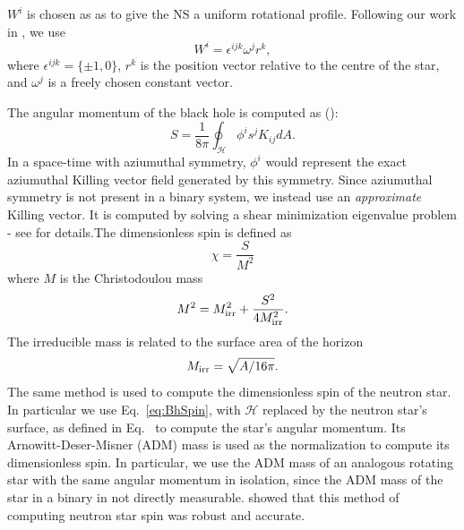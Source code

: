 $W^i$ is chosen as as to give the NS a uniform rotational
profile. Following our work in \cite{Tacik:2015tja}, we use
\begin{equation}
\label{eq:RotationTerm}
W^i=\epsilon^{ijk}\omega^jr^k,
\end{equation}
where $\epsilon^{ijk}=\{\pm1,0\}$, $r^k$ is the position vector relative to the centre of the star, and $\omega^j$ is a freely chosen constant vector.

The angular momentum of the black hole is computed as  (\cite{FoucartEtAl:2008}):
\begin{equation}
\label{eq:BhSpin}
S=\frac{1}{8\pi}\oint_{\mathcal{H}}\phi^is^jK_{ij}dA
.
\end{equation}
 In a space-time with aziumuthal symmetry, $\phi^i$ would represent
 the exact aziumuthal Killing vector field generated by this symmetry.
Since aziumuthal symmetry is not present in a binary system, we
instead use an {\it approximate} Killing vector. It is computed by solving a
shear minimization eigenvalue problem - see \cite{Cook2007,Lovelace2008}  for details.The dimensionless spin is defined as
\begin{equation}
\chi=\frac{S}{M^2}
\end{equation}
where $M$ is the Christodoulou mass
\begin{equation}
M^2=M_{\rm irr}^2+\frac{S^2}{4M_{\rm irr}^2}.
\end{equation}
The irreducible mass is related to the surface area of the horizon
\begin{equation}
M_{\rm irr}=\sqrt{A/16\pi}.
\end{equation}
The same method is used to compute the dimensionless spin of the
neutron star. In particular we use Eq.~\ref{eq:BhSpin}, with
$\mathcal{H}$ replaced by the neutron star's surface, as defined in
Eq.~\label{eq:NSSurf} to compute the star's angular momentum. Its
Arnowitt-Deser-Misner (ADM) mass is used as the normalization to
compute its dimensionless spin. In particular, we use the ADM mass of
an analogous rotating star with the same angular momentum in
isolation, since the ADM mass of the star in a binary in not directly
measurable. \cite{Tacik:2015tja} showed that this method of computing
neutron star spin was robust and accurate.

